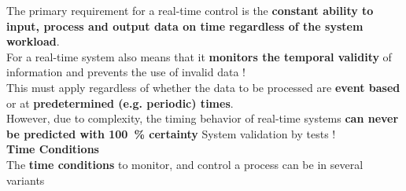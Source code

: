 The primary requirement for a real-time control is the \textbf{constant ability to input, process and output data on time regardless of the system workload}.\\ 

For a real-time system also means that it \textbf{monitors the temporal validity} of information and prevents the use of invalid data !\\

This must apply regardless of whether the data to be processed are \textbf{event based} or at \textbf{predetermined (e.g. periodic) times}.\\

However, due to complexity, the timing behavior of real-time systems \textbf{can never be predicted with 100~\% certainty}  System validation by tests !\\

{\rot\bf Time Conditions}\\

The \textbf{time conditions} to monitor, and control a process can be in several variants

